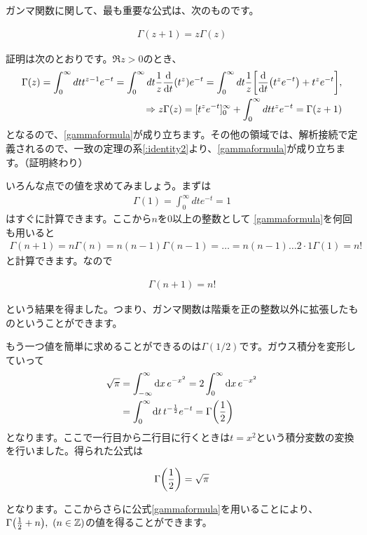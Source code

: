 \documentclass[report,paper=a4, fontsize=12pt, line_length=16cm, number_of_lines=33,dvipdfmx]{jlreq}
\newenvironment{important}{\begin{tcolorbox}[
  colback = white,
  colframe = red!35,
  boxrule = 2mm,
  fonttitle = \bfseries,
  after = \noindent] }{\end{tcolorbox}}
\numberwithin{equation}{section}
\newcommand{\Zb}{\mathbb{Z}}
\begin{document}
ガンマ関数に関して、最も重要な公式は、次のものです。
\begin{important}
  \begin{align}
    \Gamma(z+1)=z\Gamma(z)\label{gammaformula}
  \end{align}
\end{important}
証明は次のとおりです。$\Re z >0$のとき、
\begin{align}
  \Gamma(z)
  =\int_0^{\infty}dt t^{z-1}e^{-t}
  =\int_0^{\infty}dt \frac{1}{z}\dv{t}(t^{z})e^{-t}
  =\int_0^{\infty}dt \frac{1}{z}\qty[\dv{t}(t^{z}e^{-t})+t^ze^{-t}],\\
\Rightarrow
z\Gamma(z)=[t^{z}e^{-t}]_0^{\infty}+\int_0^{\infty}dt t^{z}e^{-t}=\Gamma(z+1)
\end{align}
となるので、\eqref{gammaformula}が成り立ちます。その他の領域では、解析接続で定義されるので、一致の定理の系\ref{:identity2}より、\eqref{gammaformula}が成り立ちます。（証明終わり）

いろんな点での値を求めてみましょう。まずは
\begin{align}
  \Gamma(1)=\int_{0}^{\infty} dt e^{-t}=1
\end{align}
はすぐに計算できます。ここから$n$を$0$以上の整数として
\eqref{gammaformula}を何回も用いると
\begin{align}
  \Gamma(n+1)=n\Gamma(n)=n(n-1)\Gamma(n-1)=\dots
  =n(n-1)\dots 2\cdot 1 \Gamma(1)=n!
\end{align}
と計算できます。なので
\begin{important}
\begin{align}
  \Gamma(n+1)=n!  \label{gammafactorial}
\end{align}
\end{important}
という結果を得ました。つまり、ガンマ関数は階乗を正の整数以外に拡張したものということができます。

もう一つ値を簡単に求めることができるのは$\Gamma(1/2)$です。ガウス積分を変形していって
\begin{align}
  \sqrt{\pi}&=\int_{-\infty}^{\infty}\dd{x}e^{-x^2}
  =2\int_{0}^{\infty}\dd{x}e^{-x^2}\nonumber\\
&=\int_{0}^{\infty}\dd{t} t^{-\frac12}e^{-t}=\Gamma\qty(\frac12)
\end{align}
となります。ここで一行目から二行目に行くときは$t=x^2$という積分変数の変換を行いました。得られた公式は
\begin{important}
  \begin{align}
    \Gamma\qty(\frac12)=\sqrt{\pi}
  \end{align}
\end{important}
となります。ここからさらに公式\eqref{gammaformula}を用いることにより、$\Gamma\qty(\frac12 +n),\ (n\in \Zb)$の値を得ることができます。
\end{document}
